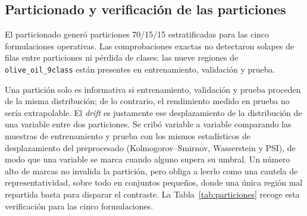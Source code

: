 \begin{table}[!htbp]
  \centering
  \caption[Invarianza del preprocesado]{Verificación de invarianza del
    preprocesado. Todas las métricas comparan el dato crudo con el
    procesado: la correlación de Spearman entre los \textit{rankings} de
    asociación variable--target debe ser cercana a $1$, y el resto de
    estadísticos de desplazamiento (KS, Wasserstein, PSI) y la variación
    de redundancia deben ser nulos si el preprocesado no alteró el
    problema.}
  \label{tab:postproc}
  \scriptsize
\end{table}
\FloatBarrier

\subsection{Particionado y verificación de las particiones}

El particionado generó particiones 70/15/15 estratificadas para las
cinco formulaciones operativas. Las comprobaciones exactas no detectaron
solapes de filas entre particiones ni pérdida de clases: las nueve
regiones de \texttt{olive\_oil\_9class} están presentes en
entrenamiento, validación y prueba.

Una partición solo es informativa si entrenamiento, validación y prueba
proceden de la misma distribución; de lo contrario, el rendimiento medido
en prueba no sería extrapolable. El \emph{drift} es justamente ese
desplazamiento de la distribución de una variable entre dos particiones.
Se cribó variable a variable comparando las muestras de entrenamiento y
prueba con los mismos estadísticos de desplazamiento del preprocesado
(Kolmogorov--Smirnov, Wasserstein y PSI), de modo que una variable se
marca cuando alguno supera su umbral. Un número alto de marcas no
invalida la partición, pero obliga a leerlo como una cautela de
representatividad, sobre todo en conjuntos pequeños, donde una única
región mal repartida basta para disparar el contraste. La
Tabla~\ref{tab:particiones} recoge esta verificación para las cinco
formulaciones.

